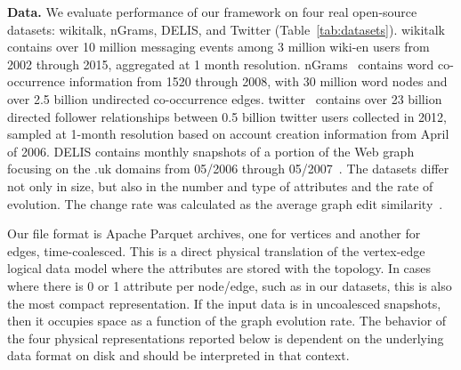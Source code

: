 {\bf Data.}  We evaluate performance of our framework on four real
open-source datasets: wikitalk, nGrams, DELIS, and Twitter
(Table~\ref{tab:datasets}).  wikitalk~\cite{wikitalk} contains over 10
million messaging events among 3 million wiki-en users from 2002
through 2015, aggregated at 1 month resolution.  nGrams~\cite{nGrams}
contains word co-occurrence information from 1520 through 2008, with
30 million word nodes and over 2.5 billion undirected co-occurrence
edges.  twitter~\cite{twitter} contains over 23 billion directed
follower relationships between 0.5 billion twitter users collected in
2012, sampled at 1-month resolution based on account creation
information from April of 2006.  DELIS contains monthly snapshots of a
portion of the Web graph focusing on the .uk domains from 05/2006
through 05/2007~\cite{BSVLTAG}.  The datasets differ not only in size,
but also in the number and type of attributes and the rate of
evolution.  The change rate was calculated as the average graph edit
similarity~\cite{Ren2011}.  

Our file format is Apache Parquet archives, one for vertices and
another for edges, time-coalesced.  This is a direct physical
translation of the vertex-edge \tg logical data model where the
attributes are stored with the topology.  In cases where there is 0 or
1 attribute per node/edge, such as in our datasets, this is also the
most compact representation.  If the input data is in uncoalesced
snapshots, then it occupies space as a function of the graph evolution
rate.  The behavior of the four physical representations reported
below is dependent on the underlying data format on disk and should be
interpreted in that context.

